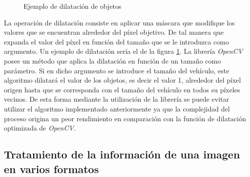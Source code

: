 \begin{figure}[hbtp]
 \centering
 \caption{Ejemplo de dilatación de objetos}
 \label{fig:dilatacion}
\end{figure}

La operación de dilatación consiste en aplicar una máscara que modifique los valores que se encuentran alrededor del píxel objetivo. De tal manera que expanda el valor del píxel en función del tamaño que se le introduzca como argumento. Un ejemplo de dilatación sería el de la figura \ref{fig:dilatacion}. La librería \emph{OpenCV} posee un método que aplica la dilatación en función de un tamaño como parámetro. Si en dicho argumento se introduce el tamaño del vehículo, este algoritmo dilatará el valor de los objetos, es decir el valor 1, alrededor del píxel origen hasta que se corresponda con el tamaño del vehículo en todos su píxeles vecinos. De esta forma mediante la utilización de la librería se puede evitar utilizar el algoritmo implementado anteriormente ya que la complejidad del proceso origina un peor rendimiento en comparación con la función de dilatación optimizada de \emph{OpenCV}. 

\subsection{Tratamiento de la información de una imagen en varios formatos}\label{sec:ImagenesJPG}

